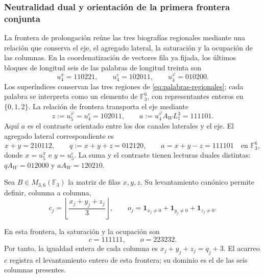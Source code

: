 \subsubsection{Neutralidad dual y orientación de la primera frontera conjunta}
\label{mg01:frontera}

La frontera de prolongación reúne las tres biografías regionales mediante
una relación que conserva el eje, el agregado lateral, la saturación y
la ocupación de las columnas. En la coordenatización de vectores fila ya fijada,
los últimos bloques de longitud seis de las palabras de longitud treinta
son
\[
 u_4^\pi=110221,\qquad u_4^e=102011,\qquad
 u_4^\varphi=010200.
\]
Los superíndices conservan las tres regiones de
\eqref{eq:palabras-regionales}; cada palabra se interpreta como un
elemento de \(\mathbb F_3^6\), con representantes enteros en
\(\{0,1,2\}\). La relación de frontera transporta el eje mediante
\begin{equation}
 z:=u_5^\varphi=u_4^e=102011,
 \qquad a:=u_4^\varphi A_WL_1^3=111101.
 \label{mg01:eje-contraste}
\end{equation}
Aquí \(a\) es el contraste orientado entre los dos canales laterales y
el eje. El agregado lateral correspondiente es
\begin{equation}
 x+y=210112,\qquad
 q:=x+y+z=012120,\qquad a=x+y-z=111101
 \quad\text{en }\mathbb F_3^6,
 \label{mg01:agregados}
\end{equation}
donde \(x=u_5^\pi\) e \(y=u_5^e\). La suma y el contraste tienen
lecturas duales distintas: \(qA_W=012000\) y \(aA_W=120210\).

Sea \(B\in M_{3,6}(\mathbb F_3)\) la matriz de filas \(x,y,z\).
Su levantamiento canónico permite definir, columna a columna,
\[
 c_j=\left\lfloor\frac{x_j+y_j+z_j}{3}\right\rfloor,
 \qquad
 o_j=\mathbf1_{x_j\ne0}+\mathbf1_{y_j\ne0}+\mathbf1_{z_j\ne0}.
\]


En esta frontera, la saturación y la ocupación son
\begin{equation}
 c=111111,\qquad o=223232.
 \label{mg01:saturacion}
\end{equation}
Por tanto, la igualdad entera de cada columna es
\(x_j+y_j+z_j=q_j+3\). El acarreo \(c\) registra el levantamiento
entero de esta frontera; su dominio es el de las seis columnas presentes.

